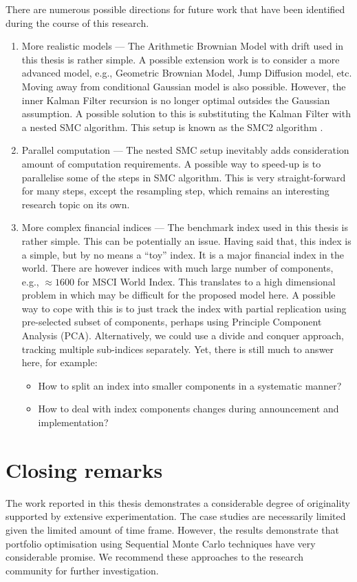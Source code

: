 There are numerous possible directions for future work that have been identified during the course of this research.
\begin{enumerate}
\item More realistic models --- The Arithmetic Brownian Model with drift used in this thesis is rather simple. A possible extension work is to consider a more advanced model, e.g., Geometric Brownian Model, Jump Diffusion model, etc. Moving away from conditional Gaussian model is also possible. However, the inner Kalman Filter recursion is no longer optimal outsides the Gaussian assumption. A possible solution to this is substituting the Kalman Filter with a nested SMC algorithm. This setup is known as the SMC2 algorithm \cite{CN13}.

\item Parallel computation --- The nested SMC setup inevitably adds consideration amount of computation requirements. A possible way to speed-up is to parallelise some of the steps in SMC algorithm. This is very straight-forward for many steps, except the resampling step, which remains an interesting research topic on its own. 

\item More complex financial indices --- The benchmark index used in this thesis is rather simple. This can
be potentially an issue. Having said that, this index is a simple, but by no means a ``toy''
index. It is a major financial index in the world. There are however indices with much large number of components, e.g., $\approx 1600$ for MSCI World Index. This translates to a high dimensional problem in which may be difficult for the proposed model here. A possible way to cope with this is to just track the index with partial replication using pre-selected subset of components, perhaps using Principle Component Analysis (PCA). Alternatively, we could use a divide and conquer approach, tracking multiple sub-indices separately. Yet, there is still much to answer here, for example:
\begin{itemize}
\item How to split an index into smaller components in a systematic manner?
\item How to deal with index components changes during announcement and implementation?
\end{itemize}
\end{enumerate}
\section{Closing remarks}
\label{ClosingRemark}
The work reported in this thesis demonstrates a considerable degree of
originality supported by extensive experimentation. The case studies
are necessarily limited given the limited amount of time frame.  However, the results
 demonstrate that portfolio optimisation using Sequential Monte Carlo techniques have very considerable promise. We recommend these approaches to
the research community for further investigation.





